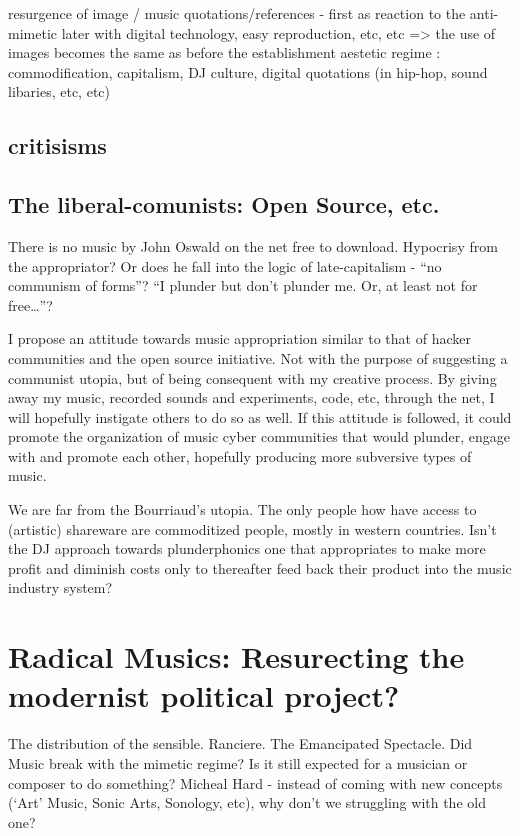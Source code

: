 resurgence of image / music quotations/references - first as reaction to the anti-mimetic
later with digital technology, easy reproduction, etc, etc => the use of images becomes the same as before the establishment aestetic regime : commodification, capitalism, DJ culture, digital quotations (in hip-hop, sound libaries, etc, etc)

\subsection{critisisms} 
\subsection{The liberal-comunists: Open Source, etc.} 

There is no music by John Oswald on the net free to download. Hypocrisy from the appropriator? Or does he fall into the logic of late-capitalism - “no communism of forms”? “I plunder but don’t plunder me. Or, at least not for free…”? 

I propose an attitude towards music appropriation similar to that of hacker communities and the open source initiative. Not with the purpose of suggesting a communist utopia, but of being consequent with my creative process. By giving away my music, recorded sounds and experiments, code, etc, through the net, I will hopefully instigate others to do so as well. If this attitude is followed, it could promote the organization of music cyber communities that would plunder, engage with and promote each other, hopefully producing more subversive types of music.

We are far from the Bourriaud’s utopia. The only people how have access to (artistic) shareware are commoditized people, mostly in western countries. Isn’t the DJ approach towards plunderphonics one that appropriates to make more profit and diminish costs only to thereafter feed back their product into the music industry system?

 
\section{Radical Musics: Resurecting the modernist political project?}
The distribution of the sensible. Ranciere.
The Emancipated Spectacle.
Did Music break with the mimetic regime? Is it still expected for a musician or composer to do something? Micheal Hard - instead of coming with new concepts (`Art' Music, Sonic Arts, Sonology, etc), why don't we struggling with the old one?

